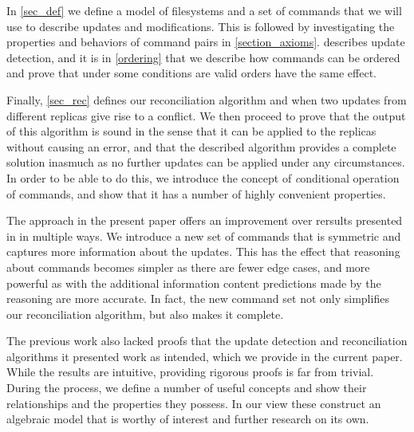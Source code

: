 In \cref{sec_def} we define a model of filesystems and a set of commands
that we will use to describe updates and modifications.
This is followed by investigating the properties and behaviors
of command pairs in \cref{section_axioms}.
 describes update detection, and it is
in \cref{ordering} that we describe how commands can be ordered
and prove that under some conditions are valid orders
have the same effect.

Finally, \cref{sec_rec} defines our reconciliation algorithm
and when two updates from different replicas give rise to a conflict.
We then proceed to prove that the output of this algorithm
is sound in the sense that 
it can be applied to the replicas without causing an error,
and that the described algorithm provides a complete solution
inasmuch as no further updates can be applied under any circumstances.
In order to be able to do this, we introduce
the concept of {\emph conditional operation} of commands,
and show that it has a number of highly convenient properties.

The approach in the present paper offers an improvement
over rersults presented in \cite{NREC} in multiple ways.
We introduce a new set of commands that is symmetric and
captures more information about the updates.
This has the effect that reasoning about commands
becomes simpler as there are fewer edge cases,
and more powerful as with the additional information
content predictions made by the reasoning are more accurate.
In fact, the new command set not only simplifies
our reconciliation algorithm, but also makes it complete.

The previous work also lacked proofs that the update detection
and reconciliation algorithms it presented work as intended,
which we provide in the current paper.
While the results are intuitive, providing rigorous proofs
is far from trivial.
During the process, we define a number of useful concepts
and show their relationships and the properties they possess.
In our view these construct an algebraic model
that is worthy of interest and further research on its own.

